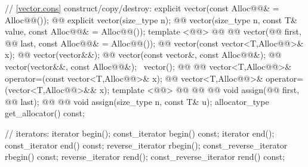 \documentclass[american,twoside]{book}
\begin{document}
\begin{codeblock}
{{    // \ref{vector.cons} construct/copy/destroy:
    explicit vector(const Alloc@@& = Alloc@@());
    @@ 
      explicit vector(size_type n);
    @@ 
      vector(size_type n, const T& value, const Alloc@@& = Alloc@@());
    template <@@>
      @@ @@
      vector(@@ first, @@ last,
             const Alloc@@& = Alloc@@());
    @@ vector(const vector<T,Alloc@@>& x);
    @@ vector(vector&&);
    @@ vector(const vector&, const Alloc@@&);
    @@ vector(vector&&, const Alloc@@&);
   ~vector();
    @@ @@
      vector<T,Alloc@@>& operator=(const vector<T,Alloc@@>& x);
    @@
      vector<T,Alloc@@>& operator=(vector<T,Alloc@@>&& x);
    template <@@>
      @@
            @@
            @@
      void assign(@@ first, @@ last);
    @@ @@
      void assign(size_type n, const T& u);
    allocator_type get_allocator() const;

    // iterators:
    iterator               begin();
    const_iterator         begin() const;
    iterator               end();
    const_iterator         end() const;
    reverse_iterator       rbegin();
    const_reverse_iterator rbegin() const;
    reverse_iterator       rend();
    const_reverse_iterator rend() const;

}}
\end{codeblock}
\end{document}
